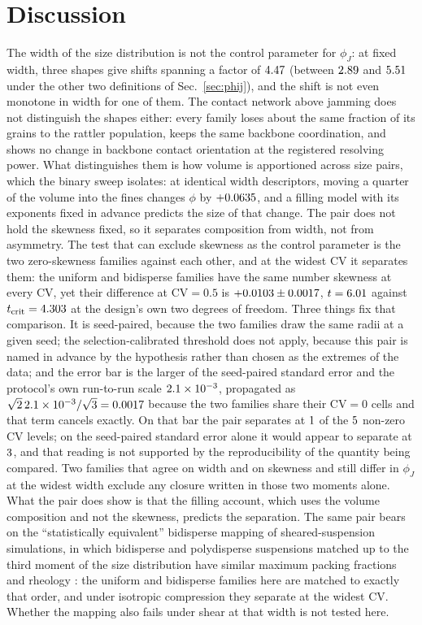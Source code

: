 \documentclass[reprint,aps,pre,amsmath,amssymb,superscriptaddress,longbibliography,nofootinbib,floatfix]{revtex4-2}
\newcommand{\phiJ}{\phi_{J}}
\newcommand{\CV}{\mathrm{CV}}
\begin{document}
\section{Discussion}

The width of the size distribution is not the control parameter for $\phiJ$: at fixed width, three shapes give shifts spanning a factor of $4.47$ (between $2.89$ and $5.51$ under the other two definitions of Sec.~\ref{sec:phij}), and the shift is not even monotone in width for one of them.
The contact network above jamming does not distinguish the shapes either: every family loses about the same fraction of its grains to the rattler population, keeps the same backbone coordination, and shows no change in backbone contact orientation at the registered resolving power.
What distinguishes them is how volume is apportioned across size pairs, which the binary sweep isolates: at identical width descriptors, moving a quarter of the volume into the fines changes $\phi$ by $+0.0635$, and a filling model with its exponents fixed in advance predicts the size of that change.
The pair does not hold the skewness fixed, so it separates composition from width, not from asymmetry.
The test that can exclude skewness as the control parameter is the two zero-skewness families against each other, and at the widest $\CV$ it separates them: the uniform and bidisperse families have the same number skewness at every $\CV$, yet their difference at $\CV=0.5$ is $+0.0103\pm0.0017$, $t=6.01$ against $t_{\mathrm{crit}}=4.303$ at the design's own two degrees of freedom.
Three things fix that comparison.
It is seed-paired, because the two families draw the same radii at a given seed; the selection-calibrated threshold does not apply, because this pair is named in advance by the hypothesis rather than chosen as the extremes of the data; and the error bar is the larger of the seed-paired standard error and the protocol's own run-to-run scale $2.1\times10^{-3}$, propagated as $\sqrt{2}\,2.1\times10^{-3}/\sqrt{3}=0.0017$ because the two families share their $\CV=0$ cells and that term cancels exactly.
On that bar the pair separates at $1$ of the $5$ non-zero $\CV$ levels; on the seed-paired standard error alone it would appear to separate at $3$, and that reading is not supported by the reproducibility of the quantity being compared.
Two families that agree on width and on skewness and still differ in $\phiJ$ at the widest width exclude any closure written in those two moments alone.
What the pair does show is that the filling account, which uses the volume composition and not the skewness, predicts the separation.
The same pair bears on the ``statistically equivalent'' bidisperse mapping of sheared-suspension simulations, in which bidisperse and polydisperse suspensions matched up to the third moment of the size distribution have similar maximum packing fractions and rheology \cite{pednekar2018bidisperse}: the uniform and bidisperse families here are matched to exactly that order, and under isotropic compression they separate at the widest $\CV$. Whether the mapping also fails under shear at that width is not tested here.
\end{document}
